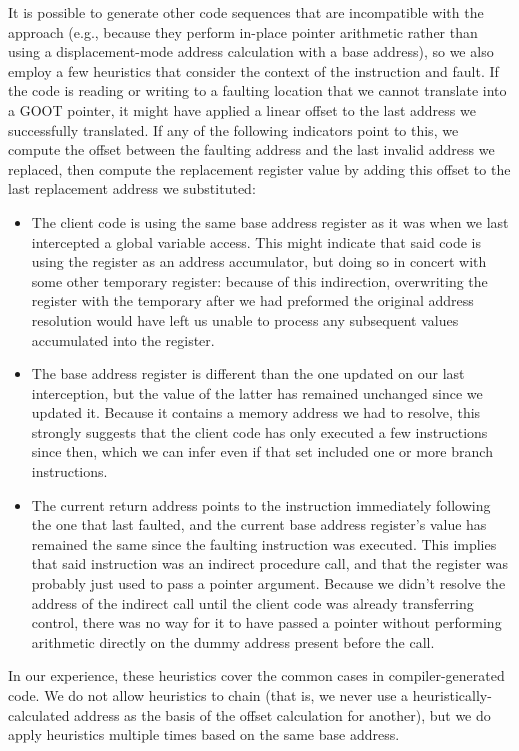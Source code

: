 It is possible to generate other code sequences that are incompatible with the
approach (e.g., because they perform in-place pointer arithmetic rather than using a
displacement-mode address calculation with a base address), so we also employ a few
heuristics that consider the context of the instruction and fault.  If the code is
reading or writing to a faulting location that we cannot translate into a GOOT
pointer, it might have applied a linear offset to the last address we successfully
translated.  If any of the following indicators point to this, we compute the offset
between the faulting address and the last invalid address we replaced, then compute
the replacement register value by adding this offset to the last replacement address
we substituted:

\begin{itemize}
\item The client code is using the same base address register as it was when
	we last intercepted a global variable access.  This might indicate that
	said code is using the register as an address accumulator, but doing
	so in concert with some other temporary register: because of this
	indirection, overwriting the register with the temporary after we
	had preformed the original address resolution would have left us
	unable to process any subsequent values accumulated into the register.
\item The base address register is different than the one updated on our last
	interception, but the value of the latter has
	remained unchanged since we updated it.  Because it contains a memory
	address we had to resolve, this strongly suggests that the client code
	has only executed a few instructions since then, which we can infer
	even if that set included one or more branch instructions.
\item The current return address points to the instruction immediately
	following the one that last faulted,
	and the current base address register's value has
	remained the same since the faulting instruction was executed.  This
	implies that said instruction was an indirect procedure call, and that
	the register was probably just used to pass a pointer argument.
	Because we didn't resolve the address of the indirect call until the
	client code was already transferring control, there was no way for it
	to have passed a pointer without performing arithmetic directly on the
	dummy address present before the call.
\end{itemize}

In our experience, these heuristics cover the common cases in compiler-generated
code.  We do not allow heuristics to chain (that is, we never use a
heuristically-calculated address as the basis of the offset calculation for another),
but we do apply heuristics multiple times based on the same base address.

